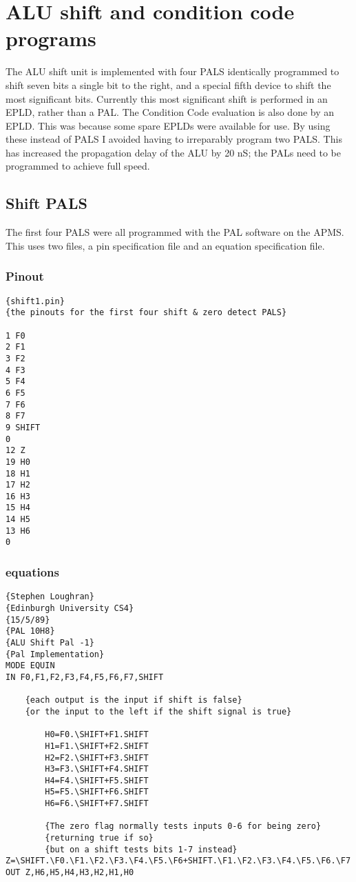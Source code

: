 \section{ALU shift and condition code programs}

The ALU shift unit is implemented with four PALS identically programmed to shift seven bits 
a single bit to the right, and a special fifth device to shift the most significant bits.
Currently this most significant shift is performed in an EPLD, rather than a PAL.
The Condition Code evaluation is also done by an EPLD.
This was because some spare EPLDs were available for use.
By using these instead of PALS I avoided having to irreparably program two PALS. 
This has increased the propagation delay of the ALU by 20 nS; 
the PALs  need to be programmed to achieve full speed.

\subsection{Shift PALS}
The first four PALS were all programmed with the PAL software on the APMS.
This uses two files, a pin specification file and an equation specification file.

\subsubsection{Pinout}
\begin{verbatim}
{shift1.pin}
{the pinouts for the first four shift & zero detect PALS}

1 F0
2 F1
3 F2
4 F3
5 F4
6 F5
7 F6
8 F7
9 SHIFT
0
12 Z
19 H0
18 H1
17 H2
16 H3
15 H4
14 H5
13 H6
0
\end{verbatim}

\subsubsection{equations}
\begin{verbatim}
{Stephen Loughran}
{Edinburgh University CS4}
{15/5/89}
{PAL 10H8}
{ALU Shift Pal -1}
{Pal Implementation}
MODE EQUIN
IN F0,F1,F2,F3,F4,F5,F6,F7,SHIFT

	{each output is the input if shift is false}
	{or the input to the left if the shift signal is true}
	
        H0=F0.\SHIFT+F1.SHIFT
        H1=F1.\SHIFT+F2.SHIFT
        H2=F2.\SHIFT+F3.SHIFT
        H3=F3.\SHIFT+F4.SHIFT
        H4=F4.\SHIFT+F5.SHIFT
        H5=F5.\SHIFT+F6.SHIFT
        H6=F6.\SHIFT+F7.SHIFT
        
        {The zero flag normally tests inputs 0-6 for being zero}
        {returning true if so}
        {but on a shift tests bits 1-7 instead}
Z=\SHIFT.\F0.\F1.\F2.\F3.\F4.\F5.\F6+SHIFT.\F1.\F2.\F3.\F4.\F5.\F6.\F7
OUT Z,H6,H5,H4,H3,H2,H1,H0
\end{verbatim}

